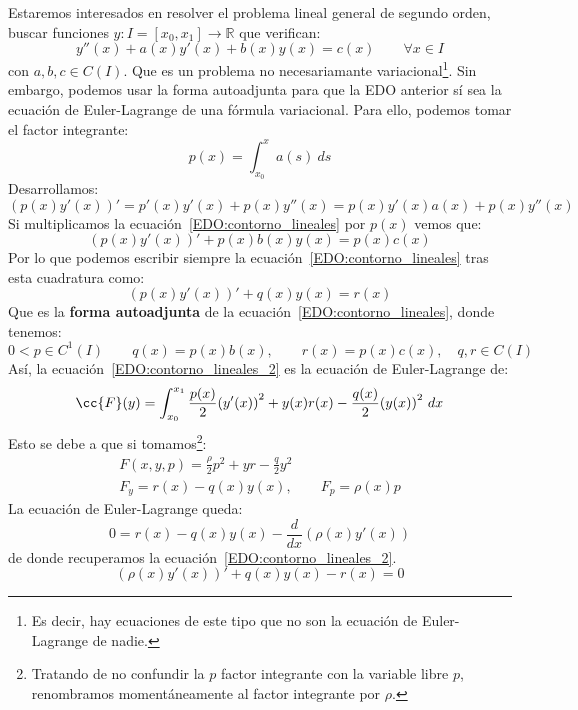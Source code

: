 \noindent
Estaremos interesados en resolver el problema lineal general de segundo orden, buscar funciones $y:I=[x_0,x_1]\to \mathbb{R}$ que verifican:
\begin{equation}\label{EDO:contorno_lineales}
    y''(x) + a(x) y'(x) + b(x) y(x) = c(x) \qquad \forall x\in I
\end{equation}
con $a,b,c\in C(I)$. Que es un problema no necesariamante variacional\footnote{Es decir, hay ecuaciones de este tipo que no son la ecuación de Euler-Lagrange de nadie.}. Sin embargo, podemos usar la forma autoadjunta para que la EDO anterior sí sea la ecuación de Euler-Lagrange de una fórmula variacional. Para ello, podemos tomar el factor integrante:
\begin{equation*}
    p(x) = \int_{x_0}^{x} a(s)~ds 
\end{equation*}
Desarrollamos:
\begin{equation*}
    (p(x)y'(x))' = p'(x) y'(x) + p(x)y''(x) = p(x) y'(x) a(x) + p(x) y''(x)
\end{equation*}
Si multiplicamos la ecuación~\eqref{EDO:contorno_lineales} por $p(x)$ vemos que:
\begin{equation*}
    (p(x)y'(x))' + p(x) b(x) y(x) = p(x) c(x)
\end{equation*}
Por lo que podemos escribir siempre la ecuación~\eqref{EDO:contorno_lineales} tras esta cuadratura como:
\begin{equation}\label{EDO:contorno_lineales_2}
    (p(x)y'(x))' + q(x) y(x) = r(x)
\end{equation}
Que es la \textbf{forma autoadjunta} de la ecuación~\eqref{EDO:contorno_lineales}, donde tenemos:
\begin{equation*}
    0 < p\in C^1(I) \qquad q(x) = p(x)b(x), \qquad r(x) = p(x)c(x), \quad q,r\in C(I)
\end{equation*}
Así, la ecuación~\eqref{EDO:contorno_lineales_2} es la ecuación de Euler-Lagrange de:
\begin{equation*}
    \cc{F}(y) = \int_{x_0}^{x_1} \frac{p(x)}{2}{(y'(x))}^{2} + y(x)r(x) - \frac{q(x)}{2}{(y(x))}^{2}~dx 
\end{equation*}
Esto se debe a que si tomamos\footnote{Tratando de no confundir la $p$ factor integrante con la variable libre $p$, renombramos momentáneamente al factor integrante por $\rho$.}:
\begin{gather*}
    F(x,y,p) = \frac{\rho}{2}p^2 + yr - \frac{q}{2}y^2 \\
    F_y = r(x) - q(x) y(x), \qquad F_p = \rho(x) p
\end{gather*}
La ecuación de Euler-Lagrange queda:
\begin{equation*}
    0 = r(x) - q(x)y(x) - \frac{d}{dx}(\rho(x) y'(x)) 
\end{equation*}
de donde recuperamos la ecuación~\eqref{EDO:contorno_lineales_2}.
\begin{equation*}
    (\rho(x) y'(x))' + q(x) y(x) - r(x) = 0
\end{equation*}

